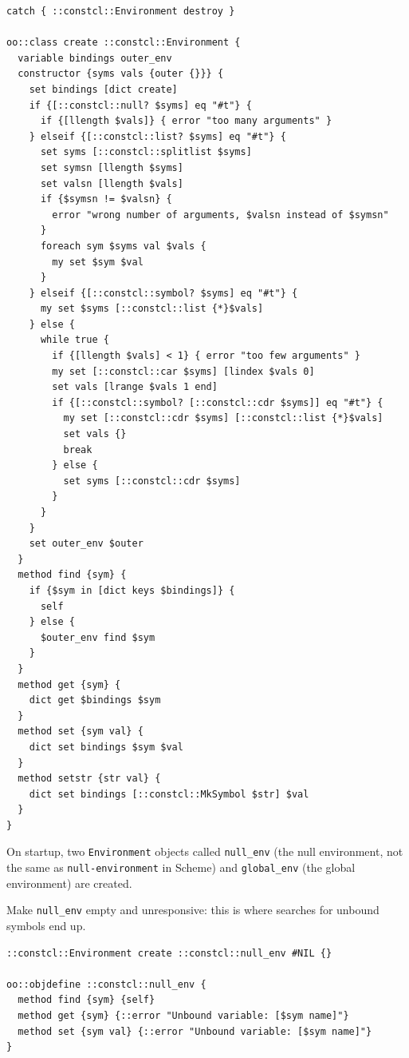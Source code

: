 \documentclass[twoside,9pt]{report}
\begin{document}
\noindent\makebox[\linewidth]{\rule{\linewidth}{0.4pt}}
\begin{lstlisting}
catch { ::constcl::Environment destroy }
 
oo::class create ::constcl::Environment {
  variable bindings outer_env
  constructor {syms vals {outer {}}} {
    set bindings [dict create]
    if {[::constcl::null? $syms] eq "#t"} {
      if {[llength $vals]} { error "too many arguments" }
    } elseif {[::constcl::list? $syms] eq "#t"} {
      set syms [::constcl::splitlist $syms]
      set symsn [llength $syms]
      set valsn [llength $vals]
      if {$symsn != $valsn} {
        error "wrong number of arguments, $valsn instead of $symsn"
      }
      foreach sym $syms val $vals {
        my set $sym $val
      }
    } elseif {[::constcl::symbol? $syms] eq "#t"} {
      my set $syms [::constcl::list {*}$vals]
    } else {
      while true {
        if {[llength $vals] < 1} { error "too few arguments" }
        my set [::constcl::car $syms] [lindex $vals 0]
        set vals [lrange $vals 1 end]
        if {[::constcl::symbol? [::constcl::cdr $syms]] eq "#t"} {
          my set [::constcl::cdr $syms] [::constcl::list {*}$vals]
          set vals {}
          break
        } else {
          set syms [::constcl::cdr $syms]
        }
      }
    }
    set outer_env $outer
  }
  method find {sym} {
    if {$sym in [dict keys $bindings]} {
      self
    } else {
      $outer_env find $sym
    }
  }
  method get {sym} {
    dict get $bindings $sym
  }
  method set {sym val} {
    dict set bindings $sym $val
  }
  method setstr {str val} {
    dict set bindings [::constcl::MkSymbol $str] $val
  }
}
\end{lstlisting}
\noindent\makebox[\linewidth]{\rule{\linewidth}{0.4pt}}

On startup, two \texttt{Environment} objects called \texttt{null\_env} (the null environment, not the same as \texttt{null-environment} in Scheme) and \texttt{global\_env} (the global environment) are created.


Make \texttt{null\_env} empty and unresponsive: this is where searches for unbound symbols end up.

\noindent\makebox[\linewidth]{\rule{\linewidth}{0.4pt}}
\begin{lstlisting}
::constcl::Environment create ::constcl::null_env #NIL {}
 
oo::objdefine ::constcl::null_env {
  method find {sym} {self}
  method get {sym} {::error "Unbound variable: [$sym name]"}
  method set {sym val} {::error "Unbound variable: [$sym name]"}
}
\end{lstlisting}
\noindent\makebox[\linewidth]{\rule{\linewidth}{0.4pt}}
\end{document}
